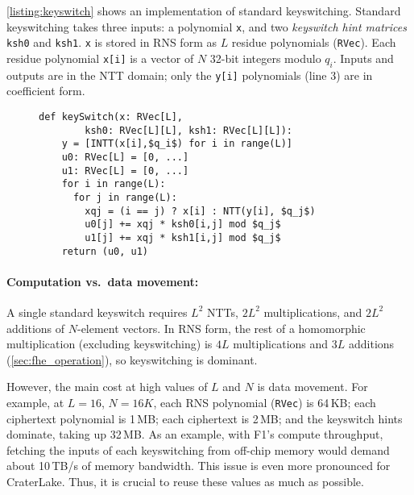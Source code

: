 \autoref{listing:keyswitch} shows an implementation of standard keyswitching.
Standard keyswitching takes three inputs: a polynomial \texttt{x}, and two
\emph{keyswitch hint matrices} \texttt{ksh0} and \texttt{ksh1}. \texttt{x} is
stored in RNS form as $L$ residue polynomials (\texttt{RVec}). Each residue
polynomial \texttt{x[i]} is a vector of $N$ 32-bit integers modulo $q_i$.
Inputs and outputs are in the NTT domain; only the \texttt{y[i]} polynomials
(line 3) are in coefficient form.


\begin{figure}
\begin{center}
  \begin{lstlisting}[caption={Standard keyswitch implementation. \texttt{RVec} is an $N$-element vector of 32-bit values, storing a single RNS polynomial in either the coefficient or the NTT domain.
    }, mathescape=true, style=custompython, label=listing:keyswitch]
  def keySwitch(x: RVec[L],
        ksh0: RVec[L][L], ksh1: RVec[L][L]):
    y = [INTT(x[i],$q_i$) for i in range(L)]
    u0: RVec[L] = [0, ...]
    u1: RVec[L] = [0, ...]
    for i in range(L):
      for j in range(L):
        xqj = (i == j) ? x[i] : NTT(y[i], $q_j$)
        u0[j] += xqj * ksh0[i,j] mod $q_j$
        u1[j] += xqj * ksh1[i,j] mod $q_j$
    return (u0, u1)
  \end{lstlisting}
\end{center}
\end{figure}

\paragraph{Computation vs.\ data movement:}
A single standard keyswitch requires $L^2$ NTTs, $2L^2$ multiplications, and
$2L^2$ additions of $N$-element \mbox{vectors}. In RNS form, the rest of a
homomorphic multiplication (excluding keyswitching) is $4L$ multiplications and
$3L$ additions (\autoref{sec:fhe_operation}), so keyswitching is dominant.

However, the main cost at high values of $L$ and $N$ is data movement. For
example, at $L = 16$, $N = 16K$, each RNS polynomial (\texttt{RVec}) is 64\,KB;
each ciphertext polynomial is 1\,MB; each ciphertext is 2\,MB; and the
keyswitch hints dominate, taking up 32\,MB. As an example, with F1's compute
throughput, fetching the inputs of each keyswitching from off-chip memory would
demand about 10\,TB/s of memory bandwidth. This issue is even more pronounced
for CraterLake. Thus, it is crucial to reuse these values as much as possible.

